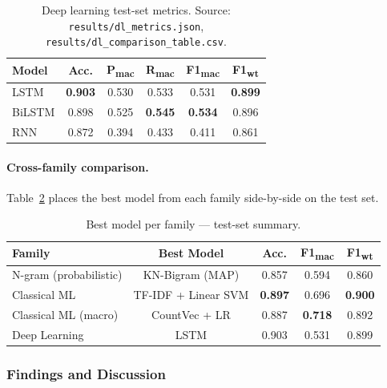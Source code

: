 \documentclass[11pt,a4paper]{article}
\begin{document}
\begin{table}[h!]
\centering
\caption{Deep learning test-set metrics.
         Source: \texttt{results/dl\_metrics.json},
         \texttt{results/dl\_comparison\_table.csv}.}
\label{tab:dl_test}
\begin{tabular}{lccccc}
\toprule
\textbf{Model} & \textbf{Acc.} &
  \textbf{P\textsubscript{mac}} & \textbf{R\textsubscript{mac}} &
  \textbf{F1\textsubscript{mac}} & \textbf{F1\textsubscript{wt}} \\
\midrule
LSTM   & \textbf{0.903} & 0.530 & 0.533 & 0.531 & \textbf{0.899} \\
BiLSTM & 0.898 & 0.525 & \textbf{0.545} & \textbf{0.534} & 0.896 \\
RNN    & 0.872 & 0.394 & 0.433 & 0.411 & 0.861 \\
\bottomrule
\end{tabular}
\end{table}

\paragraph{Cross-family comparison.}

Table~\ref{tab:overall} places the best model from each family side-by-side
on the test set.

\begin{table}[h!]
\centering
\caption{Best model per family --- test-set summary.}
\label{tab:overall}
\begin{tabular}{lcccc}
\toprule
\textbf{Family} & \textbf{Best Model} &
  \textbf{Acc.} & \textbf{F1\textsubscript{mac}} &
  \textbf{F1\textsubscript{wt}} \\
\midrule
N-gram (probabilistic) & KN-Bigram (MAP)     & 0.857 & 0.594 & 0.860 \\
Classical ML           & TF-IDF + Linear SVM & \textbf{0.897} & 0.696 & \textbf{0.900} \\
Classical ML (macro)   & CountVec + LR       & 0.887 & \textbf{0.718} & 0.892 \\
Deep Learning          & LSTM                & 0.903 & 0.531 & 0.899 \\
\bottomrule
\end{tabular}
\end{table}

\subsubsection{Findings and Discussion}
\end{document}
